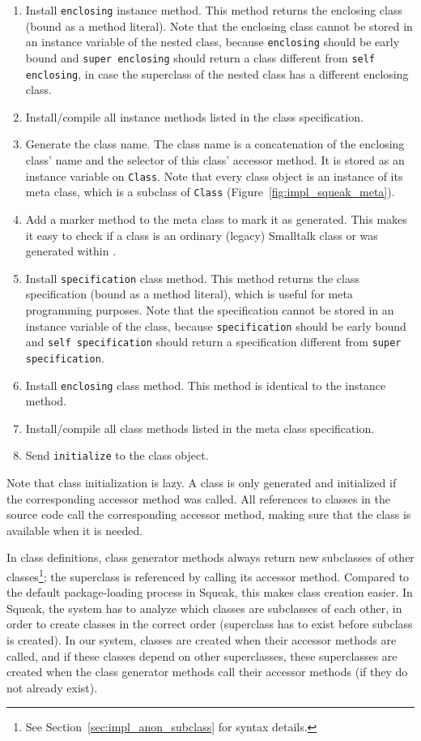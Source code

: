 \begin{enumerate}
	\item Install \texttt{enclosing} instance method. This method returns the enclosing class (bound as a method literal). Note that the enclosing class cannot be stored in an instance variable of the nested class, because \texttt{enclosing} should be early bound and \texttt{super enclosing} should return a class different from \texttt{self enclosing}, in case the superclass of the nested class has a different enclosing class.
	\item Install/compile all instance methods listed in the class specification.
	\item Generate the class name. The class name is a concatenation of the enclosing class' name and the selector of this class' accessor method. It is stored as an instance variable on \texttt{Class}. Note that every class object is an instance of its meta class, which is a subclass of \texttt{Class} (Figure~\ref{fig:impl_squeak_meta}).
	\item Add a marker method to the meta class to mark it as generated. This makes it easy to check if a class is an ordinary (legacy) Smalltalk class or was generated within \msname.
	\item Install \texttt{specification} class method. This method returns the class specification (bound as a method literal), which is useful for meta programming purposes. Note that the specification cannot be stored in an instance variable of the class, because \texttt{specification} should be early bound and \texttt{self specification} should return a specification different from \texttt{super specification}.
	\item Install \texttt{enclosing} class method. This method is identical to the instance method.
	\item Install/compile all class methods listed in the meta class specification.
	\item Send \texttt{initialize} to the class object.
\end{enumerate}

Note that class initialization is lazy. A class is only generated and initialized if the corresponding accessor method was called. All references to classes in the source code call the corresponding accessor method, making sure that the class is available when it is needed. 

In class definitions, class generator methods always return new subclasses of other classes\footnote{See Section~\ref{sec:impl_anon_subclass} for syntax details.}; the superclass is referenced by calling its accessor method. Compared to the default package-loading process in Squeak, this makes class creation easier. In Squeak, the system has to analyze which classes are subclasses of each other, in order to create classes in the correct order (superclass has to exist before subclass is created). In our system, classes are created when their accessor methods are called, and if these classes depend on other superclasses, these superclasses are created when the class generator methods call their accessor methods (if they do not already exist).

